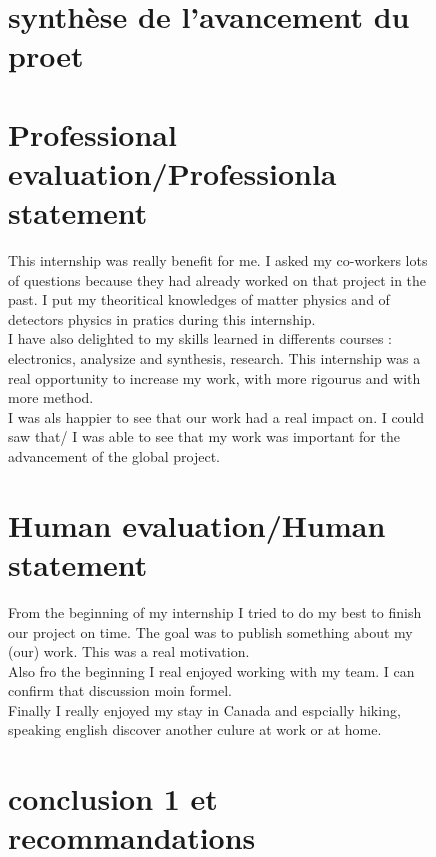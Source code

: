 \begin{figure}[!hbtp]
  
  \chapter{synthèse de l'avancement du proet}


  \chapter{Professional evaluation/Professionla statement}
  
  This internship was really benefit for me. I asked my co-workers 
  lots of questions because they had already worked on that project in the past. 
  I put my theoritical knowledges of matter physics and of detectors physics in pratics during 
  this internship. 
  \\
  
  I have also delighted to my skills learned in differents courses : 
  electronics, analysize and synthesis, research. This internship was 
  a real opportunity to increase my work, with more rigourus and with more method. 
  \\
  
  I was als happier to see that our work had a real impact on. I could saw that/ 
  I was able to see that my work was important for the advancement of the global project. 
  
  \chapter{Human evaluation/Human statement}
  
  From the beginning of my internship I tried to do my best to finish our project on time. 
  The goal was to publish something about my (our) work. This was a real motivation. 
  \\
  
  Also fro the beginning I real enjoyed working with my team. I can confirm that
  discussion moin formel. 
  \\
  
  Finally I really enjoyed my stay in Canada and espcially hiking, speaking english
 discover another culure at work or at home. 
 
 \chapter{conclusion 1 et recommandations}
  
  \\
  

\end{figure}
